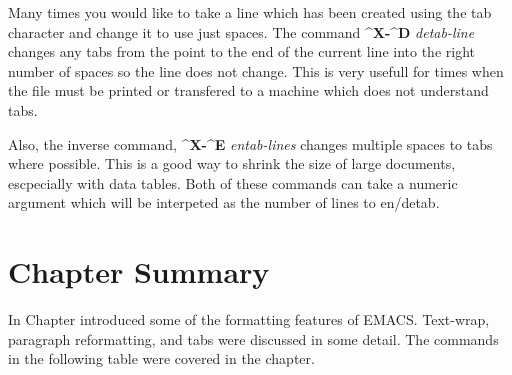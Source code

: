 Many times you would like to take a line which has been created using
the tab character and change it to use just spaces.  The command
{\bf{}\^{}X-\^{}D} {\it{}detab-line}  changes any
tabs from the point to the end of the current line into the right
number of spaces so the line does not change.  This is very usefull
for times when the file must be printed or transfered to a machine
which does not understand tabs.

Also, the inverse command, {\bf{}\^{}X-\^{}E} {\it{}entab-lines}
 changes multiple spaces to tabs where possible.
This is a good way to shrink the size of large documents, escpecially
with data tables.  Both of these commands can take a numeric argument
which will be interpeted as the number of lines to en/detab.
\section{Chapter \thechapter{} Summary}

In Chapter \thechapter{} introduced some of the formatting features of
EMACS. Text-wrap, paragraph reformatting, and tabs were discussed in
some detail.  The commands in the following table were covered in the
chapter.

